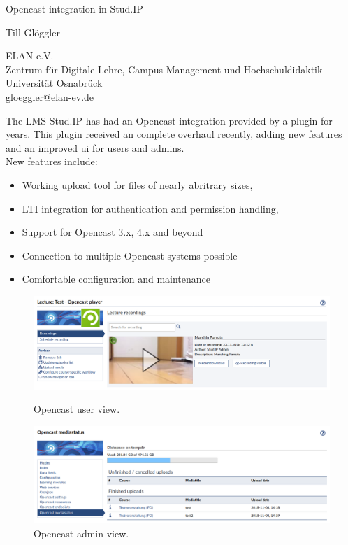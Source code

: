 \documentclass[a4paper]{article}
\begin{document}

\Large
 \begin{center}
     Opencast integration in Stud.IP\\

\hspace{10pt}

\large
Till Glöggler\\

\hspace{10pt}

\small
ELAN e.V.\\
Zentrum für Digitale Lehre, Campus Management
und Hochschuldidaktik\\
Universität Osnabrück\\
gloeggler@elan-ev.de\\


\end{center}

\hspace{10pt}

\normalsize
The LMS Stud.IP has had an Opencast integration provided by  a plugin for years. This plugin received
an complete overhaul recently, adding new features and an improved ui for users and admins.\\

New features include:
\begin{itemize}
    \item Working upload tool for files of nearly abritrary sizes,
    \item LTI integration for authentication and permission handling,
    \item Support for Opencast 3.x, 4.x and beyond
    \item Connection to multiple Opencast systems possible
    \item Comfortable configuration and maintenance
\end{itemize}

\begin{figure}[h!]
    \includegraphics[width=\linewidth]{opencast-plugin-studip-user.png}
    \caption{Opencast user view.}

    \includegraphics[width=\linewidth]{opencast-plugin-studip-admin.png}
    \caption{Opencast admin view.}
\end{figure}
\end{document}

